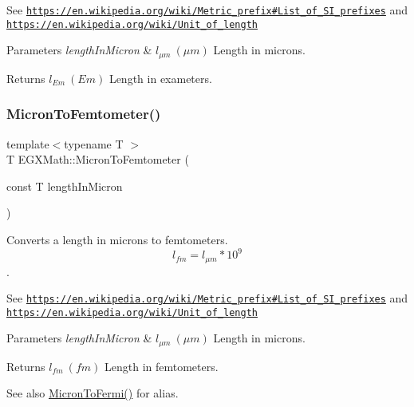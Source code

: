 See \href{https://en.wikipedia.org/wiki/Metric_prefix#List_of_SI_prefixes}{\tt https\+://en.\+wikipedia.\+org/wiki/\+Metric\+\_\+prefix\#\+List\+\_\+of\+\_\+\+S\+I\+\_\+prefixes} and \href{https://en.wikipedia.org/wiki/Unit_of_length}{\tt https\+://en.\+wikipedia.\+org/wiki/\+Unit\+\_\+of\+\_\+length} 
\begin{DoxyParams}{Parameters}
{\em length\+In\+Micron} & $ l_{\mu m}\ (\mu m)$ Length in microns. \\
\hline
\end{DoxyParams}
\begin{DoxyReturn}{Returns}
$ l_{Em}\ (Em)$ Length in exameters. 
\end{DoxyReturn}
\mbox{\label{group___e_g_x_math-_conversions-_length_conversions-_non-_s_i-_micron-_s_i_ga5e44d2763986cc07af67fdbdbe50d8fc}} 
\subsubsection{\texorpdfstring{Micron\+To\+Femtometer()}{MicronToFemtometer()}}
{\footnotesize\ttfamily template$<$typename T $>$ \\
T E\+G\+X\+Math\+::\+Micron\+To\+Femtometer (\begin{DoxyParamCaption}\item[{const T}]{length\+In\+Micron }\end{DoxyParamCaption})}



Converts a length in microns to femtometers. \[ l_{fm}=l_{\mu m} * 10^{9} \]. 

See \href{https://en.wikipedia.org/wiki/Metric_prefix#List_of_SI_prefixes}{\tt https\+://en.\+wikipedia.\+org/wiki/\+Metric\+\_\+prefix\#\+List\+\_\+of\+\_\+\+S\+I\+\_\+prefixes} and \href{https://en.wikipedia.org/wiki/Unit_of_length}{\tt https\+://en.\+wikipedia.\+org/wiki/\+Unit\+\_\+of\+\_\+length} 
\begin{DoxyParams}{Parameters}
{\em length\+In\+Micron} & $ l_{\mu m}\ (\mu m)$ Length in microns. \\
\hline
\end{DoxyParams}
\begin{DoxyReturn}{Returns}
$ l_{fm}\ (fm)$ Length in femtometers. 
\end{DoxyReturn}
\begin{DoxySeeAlso}{See also}
\mbox{\hyperlink{group___e_g_x_math-_conversions-_length_conversions-_non-_s_i-_micron-_non-_s_i_ga15284641d32129d8a82d4e50eaea346d}{Micron\+To\+Fermi()}} for alias. 
\end{DoxySeeAlso}
\mbox{\label{group___e_g_x_math-_conversions-_length_conversions-_non-_s_i-_micron-_s_i_ga412ce50d9e2bf7647e420e4f6365f9a2}} 
